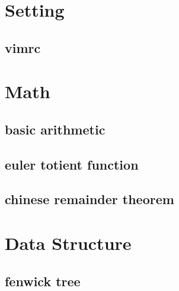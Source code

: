 \documentclass[10pt,landscape,a4paper,twocolumn]{article}
\begin{document}
\section{Setting}
\subsection{vimrc}



\section{Math}

\subsection{basic arithmetic}


\subsection{euler totient function}

\subsection{chinese remainder theorem}



\section{Data Structure}

\subsection{fenwick tree}
\end{document}
